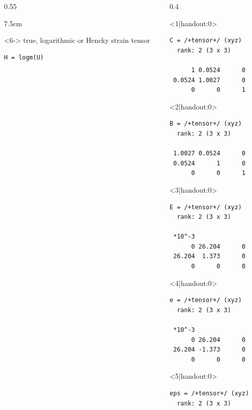 \documentclass[compress,aspectratio=1610,fleqn]{beamer}
\begin{document}
\begin{frame}[fragile]
\begin{columns}
\begin{column}{0.55\textwidth}
\begin{overlayarea}{\textwidth}{7.5cm}
          \vspace{0.2cm}

          \begin{onlyenv}<6-> true, logarithmic or Hencky strain tensor
            \vspace{-0.2cm}
\begin{lstlisting}[style=input]
H = logm(U)
\end{lstlisting}
          \end{onlyenv}
        \end{overlayarea}

  \end{column}
      \begin{column}{0.4\textwidth}
  \begin{overlayarea}{\textwidth}{\textheight}
        \begin{onlyenv}<1|handout:0>
\begin{lstlisting}[style=output]
C = /+tensor+/ (xyz)
  rank: 2 (3 x 3)

      1 0.0524      0
 0.0524 1.0027      0
      0      0      1
\end{lstlisting}
        \end{onlyenv}
        \begin{onlyenv}<2|handout:0>
\begin{lstlisting}[style=output]
B = /+tensor+/ (xyz)
  rank: 2 (3 x 3)

 1.0027 0.0524      0
 0.0524      1      0
      0      0      1
\end{lstlisting}
        \end{onlyenv}
        \begin{onlyenv}<3|handout:0>
\begin{lstlisting}[style=output]
E = /+tensor+/ (xyz)
  rank: 2 (3 x 3)

 *10^-3
      0 26.204      0
 26.204  1.373      0
      0      0      0
\end{lstlisting}
        \end{onlyenv}
        \begin{onlyenv}<4|handout:0>
\begin{lstlisting}[style=output]
e = /+tensor+/ (xyz)
  rank: 2 (3 x 3)

 *10^-3
      0 26.204      0
 26.204 -1.373      0
      0      0      0
\end{lstlisting}
        \end{onlyenv}
        \begin{onlyenv}<5|handout:0>
\begin{lstlisting}[style=output]
eps = /+tensor+/ (xyz)
  rank: 2 (3 x 3)


\end{lstlisting}
\end{onlyenv}
\end{overlayarea}
\end{column}
\end{columns}
\end{frame}
\end{document}

